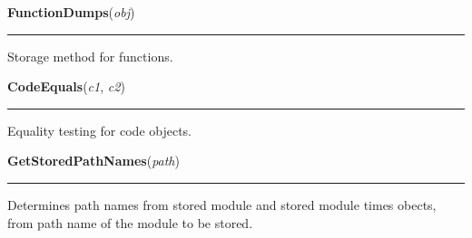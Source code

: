     \label{System:Storage:FunctionDumps}

    \vspace{0.5ex}

\hspace{.8\funcindent}\begin{boxedminipage}{\funcwidth}

    \raggedright \textbf{FunctionDumps}(\textit{obj})

    \vspace{-1.5ex}

    \rule{\textwidth}{0.5\fboxrule}
\setlength{\parskip}{2ex}
    Storage method for functions.

\setlength{\parskip}{1ex}
    \end{boxedminipage}

    \label{System:Storage:CodeEquals}

    \vspace{0.5ex}

\hspace{.8\funcindent}\begin{boxedminipage}{\funcwidth}

    \raggedright \textbf{CodeEquals}(\textit{c1}, \textit{c2})

    \vspace{-1.5ex}

    \rule{\textwidth}{0.5\fboxrule}
\setlength{\parskip}{2ex}
    Equality testing for code objects.

\setlength{\parskip}{1ex}
    \end{boxedminipage}

    \label{System:Storage:GetStoredPathNames}

    \vspace{0.5ex}

\hspace{.8\funcindent}\begin{boxedminipage}{\funcwidth}

    \raggedright \textbf{GetStoredPathNames}(\textit{path})

    \vspace{-1.5ex}

    \rule{\textwidth}{0.5\fboxrule}
\setlength{\parskip}{2ex}
    Determines path names from stored module and stored module times 
    obects, from path name of the module to be stored.

\setlength{\parskip}{1ex}
    \end{boxedminipage}


